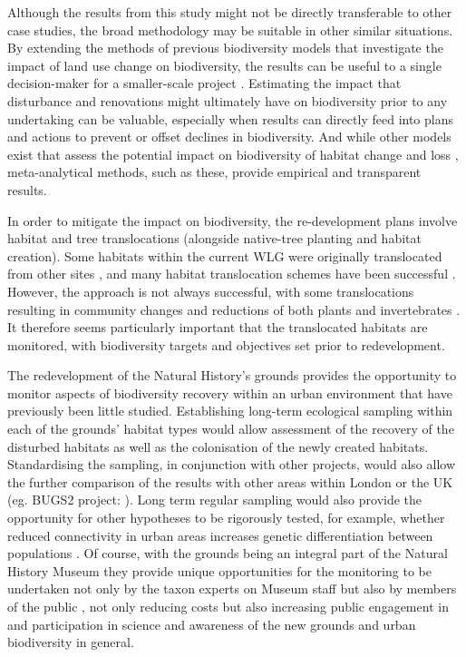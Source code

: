 Although the results from this study might not be directly transferable to other case studies, the broad methodology may be suitable in other similar situations. By extending the methods of previous biodiversity models that investigate the impact of land use change on biodiversity, the results can be useful to a single decision-maker for a smaller-scale project \citep[e.g.][]{Newbold:2015nat}. Estimating the impact that disturbance and renovations might ultimately have on biodiversity prior to any undertaking can be valuable, especially when results can directly feed into plans and actions to prevent or offset declines in biodiversity. And while other models exist that assess the potential impact on biodiversity of habitat change and loss \citep[e.g.][]{defra:2012bdo}, meta-analytical methods, such as these, provide empirical and transparent results.

In order to mitigate the impact on biodiversity, the re-development plans involve habitat and tree translocations (alongside native-tree planting and habitat creation). Some habitats within the current WLG were originally translocated from other sites \citep{Honey:1999ln,Leigh:2003ln}, and many habitat translocation schemes have been successful \citep{dunford:2010,Twyford:2012}. However, the approach is not always successful, with some translocations resulting in community changes and reductions of both plants and invertebrates \citep{Bullock:1998bc,jncc:2003ht}. It therefore seems particularly important that the translocated habitats are monitored, with biodiversity targets and objectives set prior to redevelopment. 

The redevelopment of the Natural History's grounds provides the opportunity to monitor aspects of biodiversity recovery within an urban environment that have previously been little studied. Establishing long-term ecological sampling within each of the grounds' habitat types would allow assessment of the recovery of the disturbed habitats as well as the colonisation of the newly created habitats. Standardising the sampling, in conjunction with other projects, would also allow the further comparison of the results with other areas within London \citep[e.g.,][]{Smith:2006ue} or the UK (eg. BUGS2 project: \citealt{Loram:2007le}). Long term regular sampling would also provide the opportunity for other hypotheses to be rigorously tested, for example, whether reduced connectivity in urban areas increases genetic differentiation between populations \citep{Johnson:2015ajb}. Of course, with the grounds being an integral part of the Natural History Museum they provide unique opportunities for the monitoring to be undertaken not only by the taxon experts on Museum staff but also by members of the public \citep{Silvertown:2009tree,Roy:2012citsci}, not only reducing costs but also increasing public engagement in and participation in science and awareness of the new grounds and urban biodiversity in general. 

